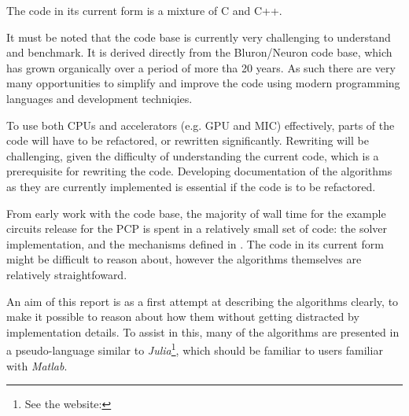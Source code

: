 The code in its current form is a mixture of C and C++.

It must be noted that the code base is currently very challenging to understand and benchmark. It is derived directly from the Bluron/Neuron code base, which has grown organically over a period of more tha 20 years. As such there are very many opportunities to simplify and improve the code using modern programming languages and development techniqies.

To use both CPUs and accelerators (e.g. GPU and MIC) effectively, parts of the code will have to be refactored, or rewritten significantly. Rewriting will be challenging, given the difficulty of understanding the current code, which is a prerequisite for rewriting the code. Developing documentation of the algorithms as they are currently implemented is essential if the code is to be refactored.

From early work with the code base, the majority of wall time for the example circuits release for the PCP is spent in a relatively small set of code: the  solver implementation, and the mechanisms defined in . The code in its current form might be difficult to reason about, however the algorithms themselves are relatively straightfoward.

An aim of this report is as a first attempt at describing the algorithms clearly, to make it possible to reason about how them without getting distracted by implementation details. To assist in this, many of the algorithms are presented in a pseudo-language similar to \emph{Julia}\footnote{See the website: }, which should be familiar to users familiar with \emph{Matlab}.

